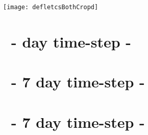 \label{chap:results}

\begin{figure*}
	\texttt{[image: defletcsBothCropd]}
	\caption[\popSevenII tracks.]{Baseline-shifted tracks. Left: anticyclones. Right: cyclones. Color represents \textit{birth}-latitude. Thickness (hardly noticeable) represents $\IQ$. Data is from a predecessor run to \popSevenII.}
	\label{fig:defletcsBothCropd}
\end{figure*}





\section{\mi~- day time-step - \avi}
\label{section:aviI}


\section{\mii~- 7 day time-step - \avi}
\label{section:aviII}


\section{\mii~- 7 day time-step - \pop}
\label{section:pop7II}


%




%

